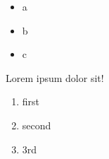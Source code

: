 \begin{itemize}
\item a
\item b
\item c
\end{itemize}
Lorem ipsum dolor sit!

\begin{enumerate}
\item first
\item second
\item 3rd
\end{enumerate}
